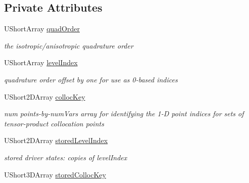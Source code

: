 \subsection*{Private Attributes}
\begin{DoxyCompactItemize}
\item 
U\+Short\+Array \hyperlink{classPecos_1_1TensorProductDriver_a2cddc7d386611ccc30a24837f755f21f}{quad\+Order}\label{classPecos_1_1TensorProductDriver_a2cddc7d386611ccc30a24837f755f21f}

\begin{DoxyCompactList}\small\item\em the isotropic/anisotropic quadrature order \end{DoxyCompactList}\item 
U\+Short\+Array \hyperlink{classPecos_1_1TensorProductDriver_aef973026ac06d9e958ad35af005ea6ee}{level\+Index}\label{classPecos_1_1TensorProductDriver_aef973026ac06d9e958ad35af005ea6ee}

\begin{DoxyCompactList}\small\item\em quadrature order offset by one for use as 0-\/based indices \end{DoxyCompactList}\item 
U\+Short2\+D\+Array \hyperlink{classPecos_1_1TensorProductDriver_a9769065f800e626de4b51de1d629ee53}{colloc\+Key}\label{classPecos_1_1TensorProductDriver_a9769065f800e626de4b51de1d629ee53}

\begin{DoxyCompactList}\small\item\em num points-\/by-\/num\+Vars array for identifying the 1-\/D point indices for sets of tensor-\/product collocation points \end{DoxyCompactList}\item 
U\+Short2\+D\+Array \hyperlink{classPecos_1_1TensorProductDriver_a3d1b090d4f030077b9b2a3e700b56735}{stored\+Level\+Index}\label{classPecos_1_1TensorProductDriver_a3d1b090d4f030077b9b2a3e700b56735}

\begin{DoxyCompactList}\small\item\em stored driver states\+: copies of level\+Index \end{DoxyCompactList}\item 
U\+Short3\+D\+Array \hyperlink{classPecos_1_1TensorProductDriver_aa4fa67da8b58dbc23908c728da6f336e}{stored\+Colloc\+Key}\label{classPecos_1_1TensorProductDriver_aa4fa67da8b58dbc23908c728da6f336e}


\end{DoxyCompactItemize}
